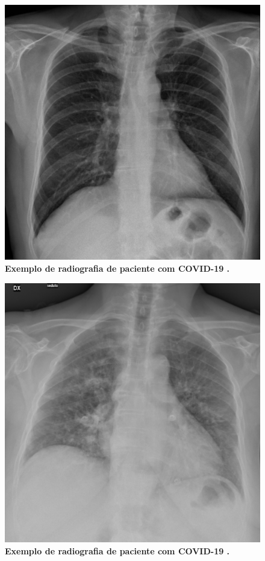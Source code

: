 \documentclass[
12pt,        %
oneside,     %
a4paper,     %
english,       %
brazil        %
%
%
]{ppgca}
\begin{document}
\begin{figure}[H]
    \includegraphics[scale=0.22]{covid1.jpeg}
    \centering
    \caption{\textbf{Exemplo de radiografia de paciente com COVID-19 \cite{repo1}.}}
    \label{fig:covid1}
\end{figure}

\begin{figure}[H]
    \includegraphics[scale=0.18]{covid2.jpeg}
    \centering
    \caption{\textbf{Exemplo de radiografia de paciente com COVID-19 \cite{repo1}.}}
    \label{fig:covid2}
\end{figure}
\end{document}
